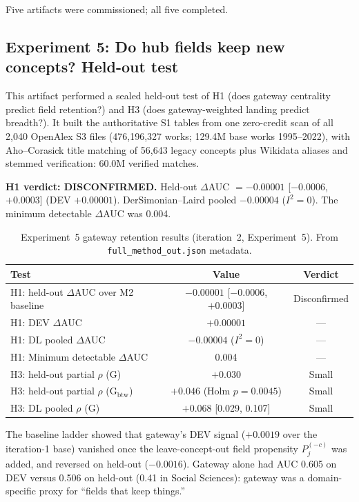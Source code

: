 \documentclass[11pt,letterpaper]{article}
\begin{document}
Five artifacts were commissioned; all five completed.

\subsection{Experiment 5: Do hub fields keep new concepts? Held-out test}

This artifact performed a sealed held-out test of H1 (does gateway centrality predict field retention?) and H3 (does gateway-weighted landing predict breadth?). It built the authoritative S1 tables from one zero-credit scan of all 2{,}040 OpenAlex S3 files (476{,}196{,}327 works; 129.4M base works 1995--2022), with Aho--Corasick title matching of 56{,}643 legacy concepts plus Wikidata aliases and stemmed verification: 60.0M verified matches.

\textbf{H1 verdict: DISCONFIRMED.} Held-out $\Delta$AUC $= -0.00001$ [$-0.0006$, $+0.0003$] (DEV $+0.00001$). DerSimonian--Laird pooled $-0.00004$ ($I^2 = 0$). The minimum detectable $\Delta$AUC was 0.004.

\begin{table}[!htbp]
\centering
\caption{Experiment~5 gateway retention results (iteration~2, Experiment~5). From \texttt{full\_method\_out.json} metadata.}
\label{tab:exp5_gateway}
\small
\begin{tabular}{lcc}
\toprule
Test & Value & Verdict \\
\midrule
H1: held-out $\Delta$AUC over M2 baseline & $-0.00001$ [$-0.0006$, $+0.0003$] & Disconfirmed \\
H1: DEV $\Delta$AUC & $+0.00001$ & --- \\
H1: DL pooled $\Delta$AUC & $-0.00004$ ($I^2 = 0$) & --- \\
H1: Minimum detectable $\Delta$AUC & 0.004 & --- \\
\midrule
H3: held-out partial $\rho$ (G) & $+0.030$ & Small \\
H3: held-out partial $\rho$ (G$_{\text{btw}}$) & $+0.046$ (Holm $p = 0.0045$) & Small \\
H3: DL pooled $\rho$ (G) & $+0.068$ [0.029, 0.107] & Small \\
\bottomrule
\end{tabular}
\end{table}

The baseline ladder showed that gateway's DEV signal ($+0.0019$ over the iteration-1 base) vanished once the leave-concept-out field propensity $P_j^{(-c)}$ was added, and reversed on held-out ($-0.0016$). Gateway alone had AUC 0.605 on DEV versus 0.506 on held-out (0.41 in Social Sciences): gateway was a domain-specific proxy for ``fields that keep things.''
\end{document}
